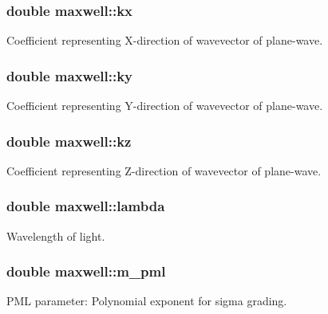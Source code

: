 \subsubsection[{\texorpdfstring{kx}{kx}}]{\setlength{\rightskip}{0pt plus 5cm}double maxwell\+::kx}\hypertarget{classmaxwell_a11e3a7a18b4ea7a1cd560d5316f22395}{}\label{classmaxwell_a11e3a7a18b4ea7a1cd560d5316f22395}
Coefficient representing X-\/direction of wavevector of plane-\/wave. 
\subsubsection[{\texorpdfstring{ky}{ky}}]{\setlength{\rightskip}{0pt plus 5cm}double maxwell\+::ky}\hypertarget{classmaxwell_a7784a4aad4a4cd36311f2583ec64f8b0}{}\label{classmaxwell_a7784a4aad4a4cd36311f2583ec64f8b0}
Coefficient representing Y-\/direction of wavevector of plane-\/wave. 
\subsubsection[{\texorpdfstring{kz}{kz}}]{\setlength{\rightskip}{0pt plus 5cm}double maxwell\+::kz}\hypertarget{classmaxwell_a5bd91522e0be939fdb2c36c909dd01c4}{}\label{classmaxwell_a5bd91522e0be939fdb2c36c909dd01c4}
Coefficient representing Z-\/direction of wavevector of plane-\/wave. 
\subsubsection[{\texorpdfstring{lambda}{lambda}}]{\setlength{\rightskip}{0pt plus 5cm}double maxwell\+::lambda}\hypertarget{classmaxwell_a7176d5bb9b188561e08c61f48619849f}{}\label{classmaxwell_a7176d5bb9b188561e08c61f48619849f}
Wavelength of light. 
\subsubsection[{\texorpdfstring{m\+\_\+pml}{m_pml}}]{\setlength{\rightskip}{0pt plus 5cm}double maxwell\+::m\+\_\+pml}\hypertarget{classmaxwell_a9e42905655eafc044c27606eea0dc1c7}{}\label{classmaxwell_a9e42905655eafc044c27606eea0dc1c7}
P\+ML parameter\+: Polynomial exponent for sigma grading. 
